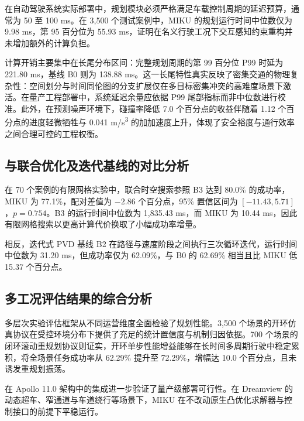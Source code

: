 在自动驾驶系统实际部署中，规划模块必须严格满足车载控制周期的延迟预算，通常为 50 至 100 ms。在 3,500 个测试案例中，MIKU 的规划运行时间中位数仅为 9.98 ms，第 95 百分位为 55.93 ms，证明在名义行驶工况下交互感知约束重构并未增加额外的计算负担。

计算开销主要集中在长尾分布区间：完整规划周期的第 99 百分位 P99 时延为 221.80 ms，基线 B0 则为 138.88 ms。这一长尾特性真实反映了密集交通的物理复杂性：空间划分与时间同伦图的分支扩展仅在多目标密集冲突的高难度场景下激活。在量产工程部署中，系统延迟余量应依据 P99 尾部指标而非中位数进行校准。此外，在预测噪声环境下，碰撞率降低 7.0 个百分点的收益伴随着 1.12 个百分点的进度轻微牺牲与 0.041 m/s\textsuperscript{3} 的加加速度上升，体现了安全裕度与通行效率之间合理可控的工程权衡。

\subsection{与联合优化及迭代基线的对比分析}

在 70 个案例的有限网格实验中，联合时空搜索参照 B3 达到 80.0\% 的成功率，MIKU 为 77.1\%，配对差值为 $-2.86$ 个百分点，95\% 置信区间为 $[-11.43,5.71]$，$p=0.754$。B3 的运行时间中位数为 1,835.43 ms，而 MIKU 为 10.44 ms，因此有限网格搜索以更高计算代价换取了小幅成功率增量。

相反，迭代式 PVD 基线 B2 在路径与速度阶段之间执行三次循环迭代，运行时间中位数为 31.20 ms，但成功率仅为 62.09\%，与 B0 的 62.69\% 相当且比 MIKU 低 15.37 个百分点。

\subsection{多工况评估结果的综合分析}

多层次实验评估框架从不同运营维度全面检验了规划性能。3,500 个场景的开环仿真协议在受控环境分布下提供了充足的统计置信度与机制归因依据。700 个场景的闭环滚动重规划协议则证实，开环单步性能增益能够在长时间多周期行驶中稳定累积，将全场景任务成功率从 62.29\% 提升至 72.29\%，增幅达 10.0 个百分点，且未诱发重规划振荡。

在 Apollo 11.0 架构中的集成进一步验证了量产级部署可行性。在 Dreamview 的动态超车、窄通道与车道绕行等场景下，MIKU 在不改动原生凸优化求解器与控制接口的前提下平稳运行。
